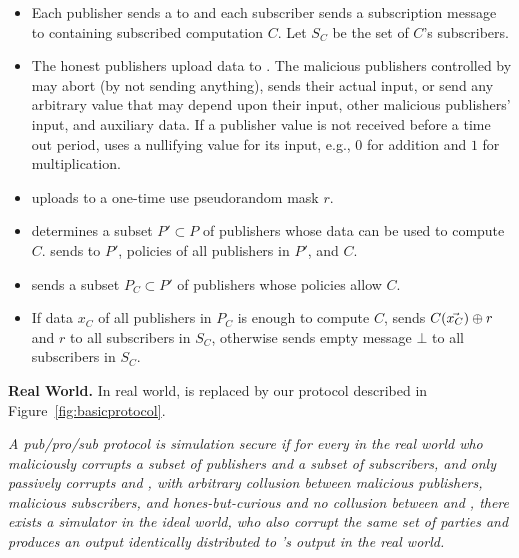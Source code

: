 \begin{itemize}[leftmargin=20pt,itemsep=4pt,topsep=4pt]
		\item Each publisher sends a \policy to \F and each subscriber sends a
			subscription message to \F containing subscribed computation $C$. Let $S_C$
			be the set of $C$'s subscribers. 
			
		
		\item The honest publishers upload data to \F. The malicious publishers
			controlled by \Adv may abort (by not sending anything), sends their
			actual input, or send any arbitrary value that may depend upon their
			input, other malicious publishers' input, and auxiliary data. If a
			publisher value is not received before a time out period, \F uses a
			nullifying value for its input, e.g., $0$ for addition and $1$ for
			multiplication. 
		
		\item \garbler uploads to \F a one-time use pseudorandom mask $r$.

		\item \F determines a subset $P' \subset P$ of publishers whose data can be
			used to compute $C$. \F sends to \broker $P'$, policies of all publishers
			in $P'$, and $C$.

		\item \broker sends \F a subset $P_C \subset P'$ of publishers whose
			policies allow $C$.
			
		\item If data $x_C$ of all publishers in $P_C$ is enough to compute $C$, \F
			sends $C(\vec{x_C}) \oplus r$ and $r$ to all subscribers in $S_C$,
			otherwise \F sends empty message $\bot$ to all subscribers in $S_C$. 

\end{itemize}

\noindent\textbf{Real World.} In real world, \F is replaced by our
protocol described in Figure~\ref{fig:basicprotocol}.

\begin{mdframed}[style=myframe]

\begin{definition}
	\label{def:security}
	\textit{	
	A pub/pro/sub protocol is simulation secure if for every \Adv in the real
	world who maliciously corrupts a subset of publishers and a subset of
	subscribers, and only passively corrupts \broker and \garbler, with arbitrary
	collusion between malicious publishers, malicious subscribers, and
	hones-but-curious \broker and \emph{no} collusion between \broker and
	\garbler, there exists a simulator \Sim in the ideal world, who also corrupt
	the same set of parties and produces an output identically distributed to
	\Adv's output in the real world.}
\end{definition}

\end{mdframed}
